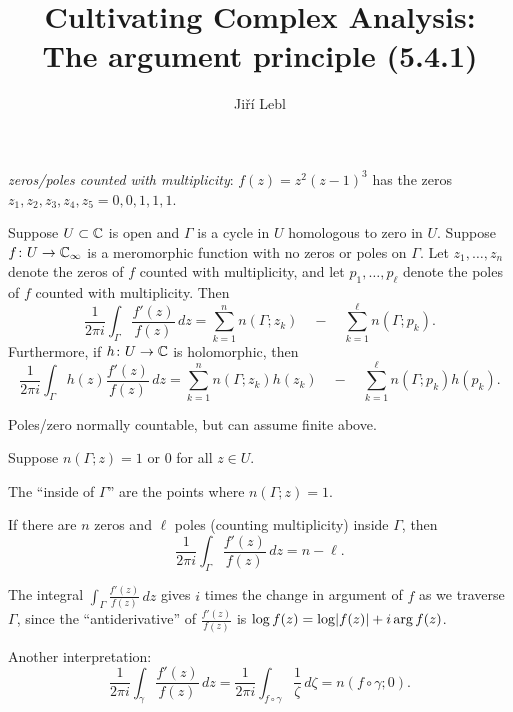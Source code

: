 \documentclass[10pt,aspectratio=169]{beamer}
\author{Ji\v{r}\'i Lebl}
\institute[OSU]{%
Departemento pri Matematiko de Oklahoma {\^S}tata Universitato}
\title{Cultivating Complex Analysis:\\%
The argument principle (5.4.1)}
\date{}
\begin{document}
\begin{frame}
\titlepage
\end{frame}

\begin{frame}
\emph{zeros/poles counted with multiplicity}:
$f(z) = z^2{(z-1)}^3$ has the zeros $z_1,z_2,z_3,z_4,z_5 = 0,0,1,1,1$.

\pause

\begin{theorem}\label{thm:argprinc}
Suppose $U \subset {\mathbb{C}}$ is open and $\Gamma$ is
a cycle in $U$
homologous to zero in $U$.
Suppose $f \colon U \to {\mathbb{C}}_\infty$ is a meromorphic function with no zeros
or poles on $\Gamma$.
Let $z_1,\ldots,z_n$ denote the 
zeros of $f$ counted with multiplicity,
and let $p_1,\ldots,p_\ell$ denote the poles of $f$ counted with multiplicity.
Then
\begin{equation*}
\frac{1}{2\pi i}
\int_\Gamma \frac{f'(z)}{f(z)} \, dz
=
\sum_{k=1}^n n(\Gamma;z_k)
\quad
-
\quad
\sum_{k=1}^\ell n(\Gamma;p_k) .
\end{equation*}
\pause
Furthermore, if $h \colon U \to {\mathbb{C}}$ is holomorphic, then
\begin{equation*}
\frac{1}{2\pi i}
\int_\Gamma h(z) \frac{f'(z)}{f(z)} \, dz
=
\sum_{k=1}^n n(\Gamma;z_k)h(z_k) 
\quad
-
\quad
\sum_{k=1}^\ell n(\Gamma;p_k)h(p_k) .
\end{equation*}
\end{theorem}

\pause

\medskip

Poles/zero normally countable, but can assume finite above.

\end{frame}

\begin{frame}

Suppose $n(\Gamma;z) = 1$ or $0$ for all $z \in U$.

\medskip

The ``inside of
$\Gamma$'' are the points where $n(\Gamma;z)=1$.

\medskip

If there are
$n$ zeros and $\ell$ poles (counting multiplicity) inside $\Gamma$, then
\begin{equation*}
\frac{1}{2\pi i}
\int_\Gamma \frac{f'(z)}{f(z)} \, dz
= n - \ell .
\end{equation*}

\bigskip
\pause 

The integral $\int_{\Gamma} \frac{f'(z)}{f(z)} \, dz$
gives $i$ times the change in argument of $f$ as we traverse $\Gamma$,
since the ``antiderivative'' of 
$\frac{f'(z)}{f(z)}$ is $\log f(z) = \log \lvert {f(z)} \rvert + i \arg f(z)$.

\bigskip
\pause

Another interpretation:
\begin{equation*}
\frac{1}{2\pi i}
\int_{\gamma} \frac{f'(z)}{f(z)} \, dz = 
\frac{1}{2\pi i}
\int_{f \circ \gamma} \frac{1}{\zeta} \, d\zeta 
=
n(f \circ \gamma ; 0 )
.
\end{equation*}

\end{frame}
\end{document}
